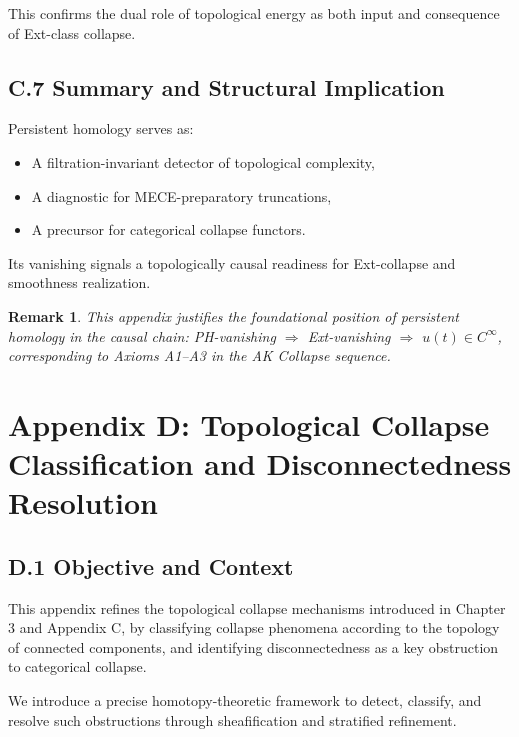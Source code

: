 \documentclass[11pt]{article}
\newtheorem{remark}[theorem]{Remark}
\begin{document}
This confirms the dual role of topological energy as both input and consequence of Ext-class collapse.

\subsection*{C.7 Summary and Structural Implication}

Persistent homology serves as:

\begin{itemize}
  \item A filtration-invariant detector of topological complexity,
  \item A diagnostic for MECE-preparatory truncations,
  \item A precursor for categorical collapse functors.
\end{itemize}

Its vanishing signals a topologically causal readiness for Ext-collapse and smoothness realization.

\begin{remark}
This appendix justifies the foundational position of persistent homology in the causal chain:  
PH-vanishing \(\Rightarrow\) Ext-vanishing \(\Rightarrow\) \( u(t) \in C^\infty \),  
corresponding to Axioms A1–A3 in the AK Collapse sequence.
\end{remark}



\section*{Appendix D: Topological Collapse Classification and Disconnectedness Resolution}

\subsection*{D.1 Objective and Context}

This appendix refines the topological collapse mechanisms introduced in Chapter 3 and Appendix C,  
by classifying collapse phenomena according to the topology of connected components,  
and identifying disconnectedness as a key obstruction to categorical collapse.

We introduce a precise homotopy-theoretic framework to detect, classify, and resolve such obstructions  
through sheafification and stratified refinement.
\end{document}
